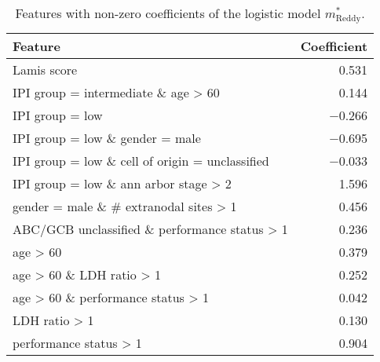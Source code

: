 \begin{table}[ht]
    \centering
    \small
    \begin{tabular}{lr}
        \hline
        \textbf{Feature} & \textbf{Coefficient} \\
        \hline
        Lamis score & \num{0.531} \\
        IPI group = intermediate \& age > 60 & \num{0.144} \\
        IPI group = low & \num{-0.266} \\
        IPI group = low \& gender = male & \num{-0.695} \\
        IPI group = low \& cell of origin = unclassified & \num{-0.033} \\
        IPI group = low \& ann arbor stage > 2 & \num{1.596} \\
        gender = male \& \# extranodal sites > 1 & \num{0.456} \\
        ABC/GCB unclassified \& performance status > 1 & \num{0.236} \\
        age > 60 & \num{0.379} \\
        age > 60 \& LDH ratio > 1 & \num{0.252} \\
        age > 60 \& performance status > 1 & \num{0.042} \\
        LDH ratio > 1 & \num{0.130} \\
        performance status > 1 & \num{0.904} \\
        \hline
    \end{tabular}
    \caption{Features with non-zero coefficients of the logistic model 
        $m^*_\text{Reddy}$.}
\end{table}